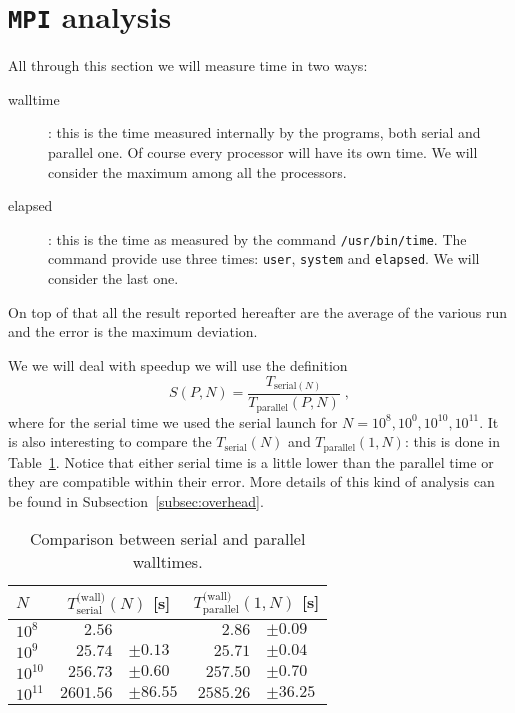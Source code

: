 \documentclass[11pt,a4paper]{article}
\newcommand{\f}{\frac}
\numberwithin{equation}{section}
\begin{document}
\section{\texttt{MPI} analysis}
All through this section we will measure time in two ways:
\begin{description}
    \item[walltime]: this is the time measured internally by the programs, both serial and parallel one. Of course every processor will have its own time. We will consider the maximum among all the processors.
    \item[elapsed]: this is the time as measured by the command \texttt{/usr/bin/time}. The command provide use three times: \texttt{user}, \texttt{system} and \texttt{elapsed}. We will consider the last one.
\end{description}
On top of that all the result reported hereafter are the average of the various run and the error is the maximum deviation.

We we will deal with speedup we will use the definition
\begin{equation}
    S(P, N) = \f{T_{\text{serial}(N)}}{T_{\text{parallel}}(P,N)}\;,
\end{equation}
where for the serial time we used the serial launch for $N= 10^8, 10^0, 10^{10}, 10^{11}$. It is also interesting to compare the $T_{\text{serial}}(N)$ and $T_{\text{parallel}}(1, N)$: this is done in Table~\ref{tab:serial_parallel}. Notice that either serial time is a little lower than the parallel time or they are compatible within their error. More details of this kind of analysis can be found in Subsection~\ref{subsec:overhead}.

\begin{table}[htbp]
    \centering\begin{tabular}{lrlrl}
        \toprule
        $N$ & \multicolumn{2}{c}{$T_{\text{serial}}^{\text{(wall)}}(N)$ [s]} & \multicolumn{2}{c}{$T_{\text{parallel}}^{\text{(wall)}}(1,N)$ [s]}\\
        \midrule
        $10^8   $ & $   2.56$&            & $   2.86$&$\pm  0.09$ \\
        $10^9   $ & $  25.74$&$\pm  0.13$ & $  25.71$&$\pm  0.04$ \\
        $10^{10}$ & $ 256.73$&$\pm  0.60$ & $ 257.50$&$\pm  0.70$ \\
        $10^{11}$ & $2601.56$&$\pm 86.55$ & $2585.26$&$\pm 36.25$ \\
        \bottomrule
    \end{tabular}
    \caption{Comparison between serial and parallel walltimes.}
    \label{tab:serial_parallel}
\end{table}
\end{document}
